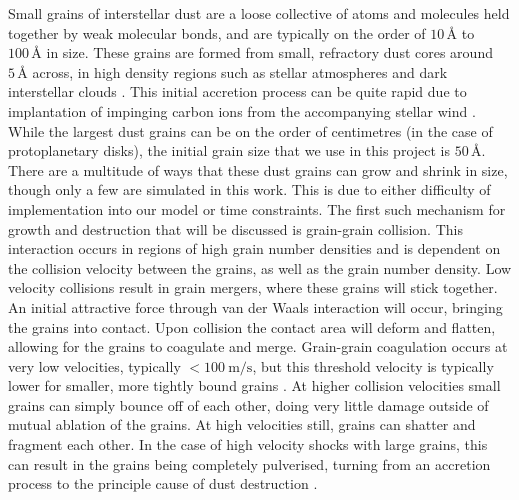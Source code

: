 Small grains of interstellar dust are a loose collective of atoms and molecules held together by weak molecular bonds, and are typically on the order of $10 \, \si{\angstrom}$ to $100 \, \si{\angstrom}$ in size.
These grains are formed from small, refractory dust cores around $5\,\si{\angstrom}$ across, in high density regions such as stellar atmospheres and dark interstellar clouds \parencite{spitzerPhysicalProcessesInterstellar2008}.
This initial accretion process can be quite rapid due to implantation of impinging carbon ions from the accompanying stellar wind \parencite{zubkoPhysicalModelDust1998a}.
While the largest dust grains can be on the order of centimetres (in the case of protoplanetary disks), the initial grain size that we use in this project is $50 \, \si{\angstrom}$.
There are a multitude of ways that these dust grains can grow and shrink in size, though only a few are simulated in this work.
This is due to either difficulty of implementation into our model or time constraints.
The first such mechanism for growth and destruction that will be discussed is grain-grain collision.
This interaction occurs in regions of high grain number densities and is dependent on the collision velocity between the grains, as well as the grain number density.
Low velocity collisions result in grain mergers, where these grains will stick together.
An initial attractive force through van der Waals interaction will occur, bringing the grains into contact.
Upon collision the contact area will deform and flatten, allowing for the grains to coagulate and merge.
Grain-grain coagulation occurs at very low velocities, typically $<\SI{100}{\metre\per\second}$, but this threshold velocity is typically lower for smaller, more tightly bound grains
\parencite{chokshiDustCoagulation1993}.
At higher collision velocities small grains can simply bounce off of each other, doing very little damage outside of mutual ablation of the grains.
At high velocities still, grains can shatter and fragment each other.
In the case of high velocity shocks with large grains, this can result in the grains being completely pulverised, turning from an accretion process to the principle cause of dust destruction
\parencite{jonesGrainShatteringShocks1996,jonesDustDestructionProcesses2004}.

